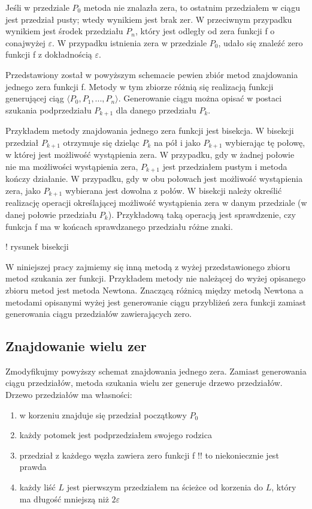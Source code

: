 \documentclass[11pt,a4paper,oneside]{report}
\begin{document}
Jeśli w przedziale $P_0$ metoda nie znalazła zera, to ostatnim przedziałem w ciągu jest przedział pusty; wtedy wynikiem jest brak zer. W przeciwnym przypadku wynikiem jest środek przedziału $P_n$, który jest odległy od zera funkcji f o conajwyżej $\varepsilon$. W przypadku istnienia zera w przedziale $P_0$, udało się znaleźć zero funkcji f z dokładnością $\varepsilon$.

Przedstawiony został w powyższym schemacie pewien zbiór metod znajdowania jednego zera funkcji f. Metody w tym zbiorze różnią się realizacją funkcji generującej ciąg $\langle P_0, P_1, ..., P_n\rangle$. Generowanie ciągu można opisać w postaci szukania podprzedziału $P_{k+1}$ dla danego przedziału $P_k$.

Przykładem metody znajdowania jednego zera funkcji jest bisekcja. W bisekcji przedział $P_{k+1}$ otrzymuje się dzieląc $P_k$ na pół i jako $P_{k+1}$ wybierając tę połowę, w której jest możliwość wystąpienia zera. W przypadku, gdy w żadnej połowie nie ma możliwości wystąpienia zera, $P_{k+1}$ jest przedziałem pustym i metoda kończy działanie. W przypadku, gdy w obu połowach jest możliwość wystąpienia zera, jako $P_{k+1}$ wybierana jest dowolna z połów. W bisekcji należy określić realizację operacji określającej możliwość wystąpienia zera w danym przedziale (w danej połowie przedziału $P_k$). Przykładową taką operacją jest sprawdzenie, czy funkcja f ma w końcach sprawdzanego przedziału różne znaki.

! rysunek bisekcji

W niniejszej pracy zajmiemy się inną metodą z wyżej przedstawionego zbioru metod szukania zer funkcji. Przykładem metody nie należącej do wyżej opisanego zbioru metod jest metoda Newtona. Znaczącą różnicą między metodą Newtona a metodami opisanymi wyżej jest generowanie ciągu przybliżeń zera funkcji zamiast generowania ciągu przedziałów zawierających zero.

\subsection{Znajdowanie wielu zer}

Zmodyfikujmy powyższy schemat znajdowania jednego zera. Zamiast generowania ciągu przedziałów, metoda szukania wielu zer generuje drzewo przedziałów. Drzewo przedziałów ma własności:
\begin{enumerate}
\item w korzeniu znajduje się przedział początkowy $P_0$
\item każdy potomek jest podprzedziałem swojego rodzica
\item przedział z każdego węzła zawiera zero funkcji f !! to niekoniecznie jest prawda
\item każdy liść $L$ jest pierwszym przedziałem na ścieżce od korzenia do $L$, który ma długość mniejszą niż $2 \varepsilon$
\end{enumerate}
\end{document}
